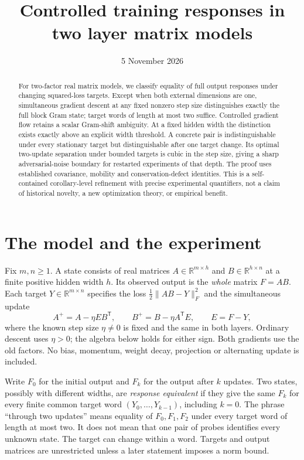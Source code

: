 \documentclass[11pt]{article}
\title{Controlled training responses in two layer matrix models}
\author{}
\date{5 November 2026}
\theoremstyle{remark}\newtheorem{remark}[theorem]{Remark}
\newcommand{\R}{\mathbb R}
\begin{document}
\maketitle
\begin{abstract}
For two-factor real matrix models, we classify equality of full output
responses under changing squared-loss targets. Except when both external
dimensions are one, simultaneous gradient descent at any fixed nonzero
step size distinguishes exactly the full block Gram state; target words
of length at most two suffice. Controlled gradient flow retains a scalar
Gram-shift ambiguity. At a fixed hidden width the distinction exists
exactly above an explicit width threshold. A concrete pair is
indistinguishable under every stationary target but distinguishable after
one target change. Its optimal two-update separation under bounded targets
is cubic in the step size, giving a sharp adversarial-noise boundary for
restarted experiments of that depth. The proof uses established covariance,
mobility and conservation-defect identities. This is a self-contained
corollary-level refinement with precise experimental quantifiers, not a
claim of historical novelty, a new optimization theory, or empirical benefit.
\end{abstract}

\section{The model and the experiment}
Fix $m,n\geq1$. A state consists of real matrices
$A\in\R^{m\times h}$ and $B\in\R^{h\times n}$ at a finite positive hidden
width $h$. Its observed output is the \emph{whole} matrix $F=AB$.
Each target $Y\in\R^{m\times n}$ specifies the loss
$\tfrac12\|AB-Y\|_F^2$ and the simultaneous update
\begin{equation}\label{eq:factor-step}
 A^+=A-\eta EB^{\mathsf T},\qquad
 B^+=B-\eta A^{\mathsf T}E,\qquad E=F-Y,
\end{equation}
where the known step size $\eta\ne0$ is fixed and the same in both layers.
Ordinary descent uses $\eta>0$; the algebra below holds for either sign.
Both gradients use the old factors. No bias, momentum, weight decay,
projection or alternating update is included.

Write $F_0$ for the initial output and $F_k$ for the output after $k$
updates. Two states, possibly with different widths, are \emph{response
equivalent} if they give the same $F_k$ for every finite common target
word $(Y_0,\ldots,Y_{k-1})$, including $k=0$. The phrase ``through two
updates'' means equality of $F_0,F_1,F_2$ under every target word of length
at most two. It does not mean that one pair of probes identifies every
unknown state. The target can change within a word. Targets and output
matrices are unrestricted unless a later statement imposes a norm bound.
\end{document}
